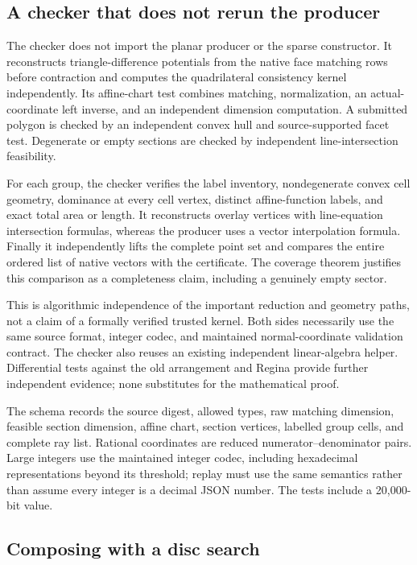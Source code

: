 \subsection{A checker that does not rerun the producer}

The checker does not import the planar producer or the sparse
constructor.  It reconstructs triangle-difference potentials from
the native face matching rows before contraction and computes the
quadrilateral consistency kernel independently.  Its affine-chart
test combines matching, normalization, an actual-coordinate left
inverse, and an independent dimension computation.  A submitted
polygon is checked by an independent convex hull and source-supported
facet test.  Degenerate or empty sections are checked by independent
line-intersection feasibility.

For each group, the checker verifies the label inventory,
nondegenerate convex cell geometry, dominance at every cell vertex,
distinct affine-function labels, and exact total area or length.
It reconstructs overlay vertices with line-equation intersection
formulas, whereas the producer uses a vector interpolation formula.
Finally it independently lifts the complete point set and compares
the entire ordered list of native vectors with the certificate.
The coverage theorem justifies this comparison as a completeness
claim, including a genuinely empty sector.

This is algorithmic independence of the important reduction and
geometry paths, not a claim of a formally verified trusted kernel.
Both sides necessarily use the same source format, integer codec,
and maintained normal-coordinate validation contract.  The checker
also reuses an existing independent linear-algebra helper.  Differential
tests against the old arrangement and Regina provide further
independent evidence; none substitutes for the mathematical proof.

The schema  records the source digest,
allowed types, raw matching dimension, feasible section dimension,
affine chart, section vertices, labelled group cells, and complete
ray list.  Rational coordinates are reduced numerator--denominator
pairs.  Large integers use the maintained integer codec, including
hexadecimal representations beyond its threshold; replay must use
the same semantics rather than assume every integer is a decimal
JSON number.  The tests include a 20,000-bit value.

\subsection{Composing with a disc search}

